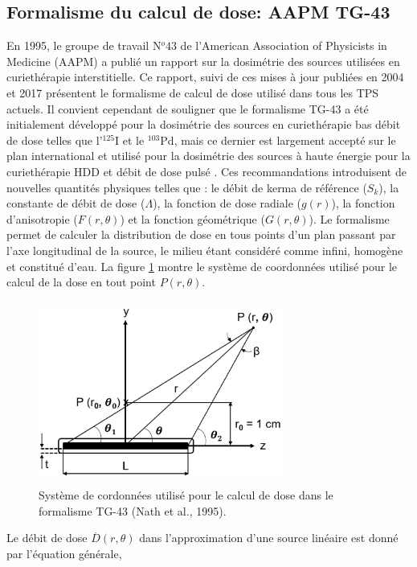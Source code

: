 \subsection{Formalisme du calcul de dose: AAPM TG-43}\label{sssec:TG-43} 
En 1995, le groupe de travail N$^{o} 43$ \cite{AAPMTG-43} de l'American Association of Physicists in Medicine (AAPM) a publié un rapport sur la dosimétrie des sources utilisées en curiethérapie interstitielle. Ce rapport, suivi de ces mises à jour publiées en 2004 et 2017 \cite{AAPMTG-43R1, AAPMTG-43R2} présentent le formalisme de calcul de dose utilisé dans tous les TPS actuels. Il convient cependant de souligner que le formalisme TG-43 a été initialement développé pour la dosimétrie des sources en curiethérapie bas débit de dose telles que l'${}^{125}$I et le ${}^{103}$Pd, mais ce dernier est largement accepté sur le plan international et utilisé pour la dosimétrie des sources à haute énergie pour la curiethérapie HDD et débit de dose pulsé \cite{Venselaar}. Ces recommandations introduisent de nouvelles quantités physiques telles que : le débit de kerma de référence ($S_{k}$), la constante de débit de dose ($\Lambda$), la fonction de dose radiale ($g(r)$), la fonction d’anisotropie ($F(r, \theta)$) et la fonction géométrique ($G(r, \theta)$). Le formalisme permet de calculer la distribution de dose en tous points d’un plan passant par l’axe longitudinal de la source, le milieu étant considéré comme infini, homogène et constitué d’eau. La figure \ref{FigureTG-43} montre le système de coordonnées utilisé pour le calcul de la dose en tout point $P(r, \theta)$.
%
\begin{figure}%
\centering
\includegraphics[width=8.0cm, height=6.0cm]{FigureTG-43.eps}
\caption{\label{FigureTG-43} Système de cordonnées utilisé pour le calcul de dose dans le formalisme TG-43 (Nath et al., 1995).}
\end{figure}
%
Le débit de dose $\stackrel{.}{D} (r, \theta)$ dans l’approximation d’une source linéaire est donné par l’équation générale,
